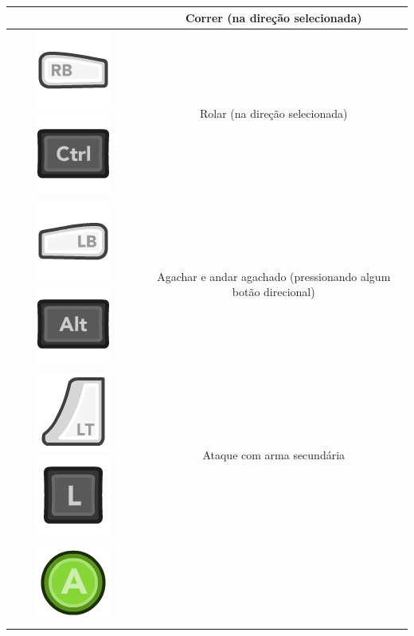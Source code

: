 \documentclass{article}
\begin{document}
\begin{longtable}{|c|c|}
 & Correr (na direção selecionada)
\\
\hline
\includegraphics[scale=0.3]{images/360_RB.png}
\includegraphics[scale=0.3]{images/kCtrl.png}
& Rolar (na direção selecionada) 
\\
\hline
\includegraphics[scale=0.3]{images/360_LB.png}
\includegraphics[scale=0.3]{images/kAlt.png}
& Agachar e andar agachado (pressionando algum botão direcional)
\\
\hline
\includegraphics[scale=0.3]{images/360_LT.png}
\includegraphics[scale=0.3]{images/kL.png}
& Ataque com arma secundária
\\
\hline
\includegraphics[scale=0.3]{images/360_A.png}

\end{longtable}
\end{document}

